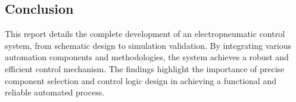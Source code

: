 \subsection{Conclusion}

This report details the complete development of an electropneumatic control system, from schematic 
design to simulation validation. By integrating various automation components and methodologies, 
the system achieves a robust and efficient control mechanism. The findings highlight the importance 
of precise component selection and control logic design in achieving a functional and reliable 
automated process.